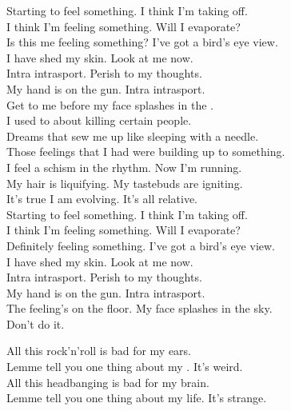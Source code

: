 Starting to feel something. I think I'm taking off. \\
I think I'm feeling something. Will I evaporate? \\
Is this me feeling something? I've got a bird's eye view. \\
I have shed my skin. Look at me now. \\

Intra intrasport. Perish to my thoughts. \\
My hand is on the gun. Intra intrasport. \\
Get to me before my face splashes in the . \\

I used to  about killing certain people. \\
Dreams that sew me up like sleeping with a needle. \\
Those feelings that I had were building up to something. \\
I feel a schism in the rhythm. Now I'm running. \\

My hair is liquifying. My tastebuds are igniting. \\
It's true I am evolving. It's all relative. \\

Starting to feel something. I think I'm taking off. \\
I think I'm feeling something. Will I evaporate? \\
Definitely feeling something. I've got a bird's eye view. \\
I have shed my skin. Look at me now. \\

Intra intrasport. Perish to my thoughts. \\
My hand is on the gun. Intra intrasport. \\
The feeling's on the floor. My face splashes in the sky. \\

Don't do it. \\




All this rock'n'roll is bad for my ears. \\
Lemme tell you one thing about my . It's weird. \\
All this headbanging is bad for my brain. \\
Lemme tell you one thing about my life. It's strange. \\

